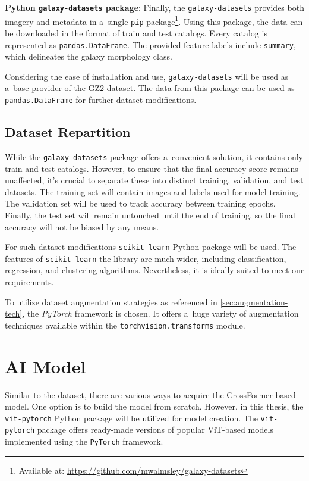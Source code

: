 \medskip

\textbf{Python \texttt{galaxy-datasets} package}:
Finally, the \texttt{galaxy-datasets} provides both imagery and metadata in a~single \verb|pip| package\footnote{Available at: \url{https://github.com/mwalmsley/galaxy-datasets}}. Using this package, the data can be downloaded in the format of train and test catalogs. Every catalog is represented as \texttt{pandas.DataFrame}. The provided feature labels include \texttt{summary}, which delineates the galaxy morphology class.

\medskip

Considering the ease of installation and use, \texttt{galaxy-datasets} will be used as a~base provider of the GZ2 dataset. The data from this package can be used as \texttt{pandas.DataFrame} for further dataset modifications.

\subsection*{Dataset Repartition}
\label{sec:draft-dataset}

While the \texttt{galaxy-datasets} package offers a~convenient solution, it contains only train and test catalogs. However, to ensure that the final accuracy score remains unaffected, it's crucial to separate these into distinct training, validation, and test datasets. The training set will contain images and labels used for model training. The validation set will be used to track accuracy between training epochs. Finally, the test set will remain untouched until the end of training, so the final accuracy will not be biased by any means.

For such dataset modifications \texttt{scikit-learn} Python package will be used. The features of \texttt{scikit-learn} the library are much wider, including classification, regression, and clustering algorithms. Nevertheless, it is ideally suited to meet our requirements.

To utilize dataset augmentation strategies as referenced in \autoref{sec:augmentation-tech}, the \textit{PyTorch} framework is chosen. It offers a~huge variety of augmentation techniques available within the \texttt{torchvision.transforms} module.

\section*{AI Model}

Similar to the dataset, there are various ways to acquire the CrossFormer-based model. One option is to build the model from scratch. However, in this thesis, the \texttt{vit-pytorch} Python package will be utilized for model creation. The \texttt{vit-pytorch} package offers ready-made versions of popular ViT-based models implemented using the \texttt{PyTorch} framework.

